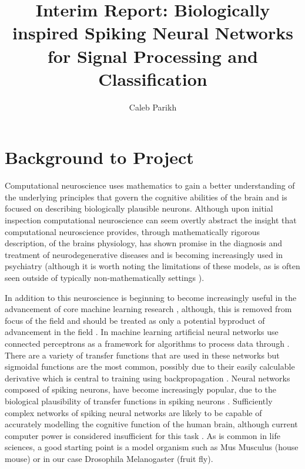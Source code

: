 \documentclass[fleqn,12pt]{wlscirep}
\title{Interim Report: Biologically inspired Spiking Neural Networks for Signal Processing and
Classification}
\author[1]{Caleb Parikh}
\affil{University of Sheffield,Automatic Control Systems Engineering}
\begin{document}
\flushbottom

\maketitle

\thispagestyle{empty}

\newpage
\section*{Background to Project}
Computational neuroscience uses mathematics to gain a better understanding of the underlying principles that govern the cognitive abilities of the brain \cite{noauthor_computational_nodate} and is focused on describing biologically plausible neurons. Although upon initial inspection computational neuroscience can seem overtly abstract \cite{singer_neuronal_1999} \cite{cleland_computation_2005}
the insight that computational neuroscience provides, through mathematically rigorous description, of the brains physiology, has shown promise in the diagnosis and treatment of neurodegenerative diseases \cite{huys_are_2011} and is becoming increasingly used in psychiatry \cite{huys_computational_2016} (although it is worth noting the limitations of these models, as is often seen outside of typically non-mathematically settings \cite{huys_are_2011}). 

In addition to this neuroscience is beginning to become increasingly useful in the advancement of core machine learning research \cite{marblestone_towards_2016} \cite{hassabis_neuroscience-inspired_2017}, although, this is removed from focus of the field and should be treated as only a potential byproduct of advancement in the field \cite{eliasmith_use_2014}. In machine learning artificial neural networks use connected perceptrons as a framework for algorithms to process data through \cite{noauthor_build_nodate}. There are a variety of transfer functions that are used in these networks but sigmoidal functions are the most common, possibly due to their easily calculable derivative which is central to training using backpropagation \cite{duch_survey_1999}. Neural networks composed of spiking neurons, have become increasingly popular, due to the biological plausibility of transfer functions in spiking neurons \cite{long_review_2010}. Sufficiently complex networks of spiking neural networks are likely to be capable of accurately modelling the  cognitive function of the human brain, although current computer power is considered insufficient  for this task \cite{noauthor_brain_nodate}. As is common in life sciences, a good starting point is a model organism such as Mus Musculus (house mouse) or in our case Drosophila Melanogaster (fruit fly).
\end{document}
